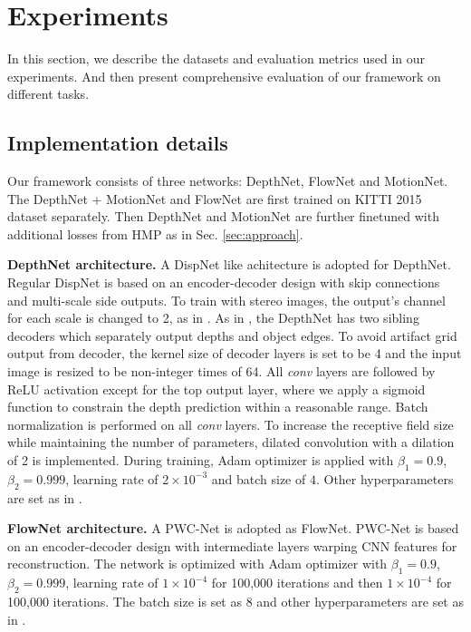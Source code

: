 \documentclass[runningheads]{llncs}
\begin{document}
 
\vspace{-0.5\baselineskip}
\section{Experiments}
\vspace{-0.5\baselineskip}
\label{sec:exp}

In this section, we describe the datasets and evaluation metrics used in our experiments. And then present comprehensive evaluation of our framework on different tasks. 

\vspace{-0.3\baselineskip}
\subsection{Implementation details}
\vspace{-0.3\baselineskip}
Our framework consists of three networks: DepthNet, FlowNet and MotionNet. The DepthNet + MotionNet and FlowNet are first trained on KITTI 2015 dataset separately. Then DepthNet and MotionNet are further finetuned with additional losses from HMP as in Sec. \ref{sec:approach}.

\vspace{0.5\baselineskip}
\noindent\textbf{DepthNet architecture.}
A DispNet \cite{mayer2016large} like achitecture is adopted for DepthNet. Regular DispNet is based on an encoder-decoder design with skip connections and multi-scale side outputs. To train with stereo images, the output's channel for each scale is changed to 2, as in \cite{godard2016unsupervised}. As in \cite{yang2018cvpr}, the DepthNet has two sibling decoders which separately output depths and object edges. To avoid artifact grid output from decoder, the kernel size of decoder layers is set to be 4 and the input image is resized to be non-integer times of 64. All \textit{conv} layers are followed by ReLU activation except for the top output layer, where we apply a sigmoid function to constrain the depth prediction within a reasonable range. Batch normalization \cite{ioffe2015batch} is performed on all \textit{conv} layers. 
To increase the receptive field size while maintaining the number of parameters, dilated convolution with a dilation of 2 is implemented. 
During training, Adam optimizer \cite{kingma2014adam} is applied with $\beta_1=0.9$, $\beta_2=0.999$, learning rate of $2\times 10^{-3}$ and batch size of $4$. Other hyperparameters are set as in \cite{yang2018cvpr}.

\vspace{0.5\baselineskip}
\noindent\textbf{FlowNet architecture.}
A PWC-Net \cite{sun2017pwc} is adopted as FlowNet. PWC-Net is based on an encoder-decoder design with intermediate layers warping CNN features for reconstruction. The network is optimized with Adam optimizer \cite{kingma2014adam} with $\beta_1=0.9$, $\beta_2=0.999$, learning rate of $1\times 10^{-4}$ for 100,000 iterations and then $1\times 10^{-4}$ for 100,000 iterations. The batch size is set as 8 and other hyperparameters are set as in \cite{wang2017occlusion}.
\end{document}
